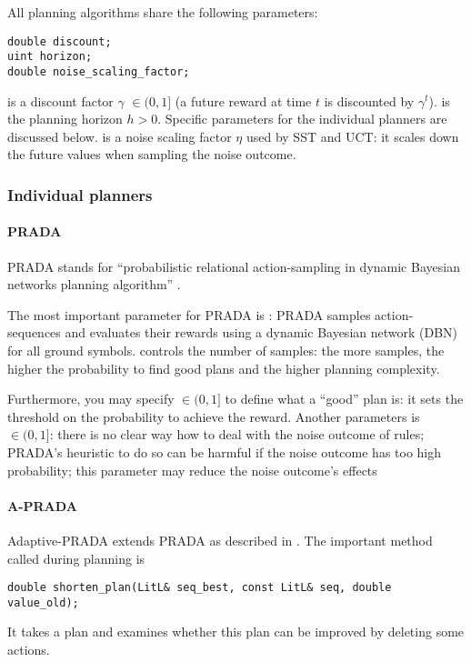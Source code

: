 \documentclass[10pt,twoside,twocolumn,fleqn]{article}
\begin{document}
All planning algorithms share the following parameters:
\begin{lstlisting}
double discount;
uint horizon;
double noise_scaling_factor;
\end{lstlisting}
 is a discount factor $\gamma$ $\in (0,1]$ (a future reward
at time $t$ is discounted by $\gamma^t$).  is the planning
horizon $h>0$. Specific parameters for the individual planners are
discussed below.  is a noise scaling factor
$\eta$ used by SST and UCT: it scales down the future values when sampling
the noise outcome.


\subsubsection{Individual planners}


\paragraph{PRADA}

PRADA stands for ``probabilistic relational action-sampling in dynamic
Bayesian networks planning algorithm'' \cite{lang-toussaint-10jair}. 

The most important parameter for PRADA is : PRADA
samples action-sequences and evaluates their rewards using a dynamic
Bayesian network (DBN)  for all ground symbols.
 controls the number of samples: the more samples, the
higher the probability to find good plans and the higher planning
complexity.

Furthermore, you may specify  $\in (0,1]$ to define
what a ``good'' plan is: it sets the threshold on the probability to
achieve the reward. Another parameters is  $\in
(0,1]$: there is no clear way how to deal with the noise outcome of rules;
PRADA's heuristic to do so can be harmful if the noise outcome has too high
probability; this parameter may reduce the noise outcome's effects



\paragraph{A-PRADA}

Adaptive-PRADA extends PRADA as described in \cite{lang-toussaint-10jair}.
The important method called during planning is 
\begin{lstlisting}
double shorten_plan(LitL& seq_best, const LitL& seq, double value_old);
\end{lstlisting}
It takes a plan and examines whether this plan can be improved by deleting
some actions.
\end{document}
